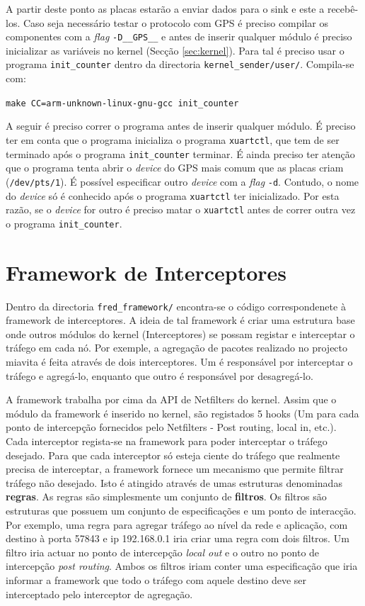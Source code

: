 \documentclass[10pt,a4paper,oneside]{book}
\begin{document}
	A partir deste ponto as placas estarão a enviar dados para o sink e este a recebê-los. Caso seja necessário testar o protocolo com GPS é preciso compilar os componentes com a \emph{flag} {\tt -D\_\_GPS\_\_} e antes de inserir qualquer módulo é preciso inicializar as variáveis no kernel (Secção \ref{sec:kernel}). Para tal é preciso usar o programa {\tt init\_counter} dentro da directoria {\tt kernel\_sender/user/}. Compila-se com:
        
        \begin{center}
          {\tt make CC=arm-unknown-linux-gnu-gcc init\_counter}
        \end{center}
	
        A seguir é preciso correr o programa antes de inserir qualquer módulo. É preciso ter em conta que o programa inicializa o programa {\tt xuartctl}, que tem de ser terminado após o programa {\tt init\_counter} terminar. É ainda preciso ter atenção que o programa tenta abrir o \emph{device} do GPS mais comum que as placas criam ({\tt /dev/pts/1}). É possível especificar outro \emph{device} com a \emph{flag} {\tt -d}. Contudo, o nome do \emph{device} só é conhecido após o programa {\tt xuartctl} ter inicializado. Por esta razão, se o \emph{device} for outro é preciso matar o {\tt xuartctl} antes de correr outra vez o programa {\tt init\_counter}.

\chapter{Framework de Interceptores}

  Dentro da directoria {\tt fred\_framework/} encontra-se o código correspondenete à framework de interceptores. A ideia de tal framework é criar uma estrutura base onde outros módulos do kernel (Interceptores) se possam registar e interceptar o tráfego em cada nó. Por exemple, a agregação de pacotes realizado no projecto miavita é feita através de dois interceptores. Um é responsável por interceptar o tráfego e agregá-lo, enquanto que outro é responsável por desagregá-lo.

  A framework trabalha por cima da API de Netfilters do kernel. Assim que o módulo da framework é inserido no kernel, são registados 5 hooks (Um para cada ponto de intercepção fornecidos pelo Netfilters - Post routing, local in, etc.). Cada interceptor regista-se na framework para poder interceptar o tráfego desejado. Para que cada interceptor só esteja ciente do tráfego que realmente precisa de interceptar, a framework fornece um mecanismo que permite filtrar tráfego não desejado. Isto é atingido através de umas estruturas denominadas \textbf{regras}. As regras são simplesmente um conjunto de \textbf{filtros}. Os filtros são estruturas que possuem um conjunto de especificações e um ponto de interacção. Por exemplo, uma regra para agregar tráfego ao nível da rede e aplicação, com destino à porta 57843 e ip 192.168.0.1 iria criar uma regra com dois filtros. Um filtro iria actuar no ponto de intercepção \emph{local out} e o outro no ponto de intercepção \emph{post routing}. Ambos os filtros iriam conter uma especificação que iria informar a framework que todo o tráfego com aquele destino deve ser interceptado pelo interceptor de agregação.
  
\end{document}
